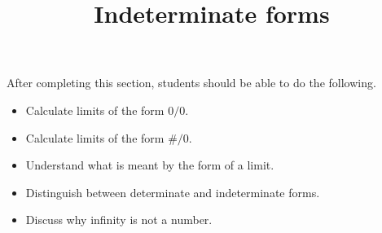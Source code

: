 \documentclass{ximera}
\title{Indeterminate forms}
\begin{document}
\begin{abstract}
\end{abstract}

\maketitle

\begin{sectionOutcomes}

After completing this section, students should be able to do the following.

\begin{itemize}
	\item Calculate limits of the form $0/0$.
	\item Calculate limits of the form $\#/0$.
	\item Understand what is meant by the form of a limit.
	\item Distinguish between determinate and indeterminate forms.
	\item Discuss why infinity is not a number.
\end{itemize}
\end{sectionOutcomes}
\end{document}
